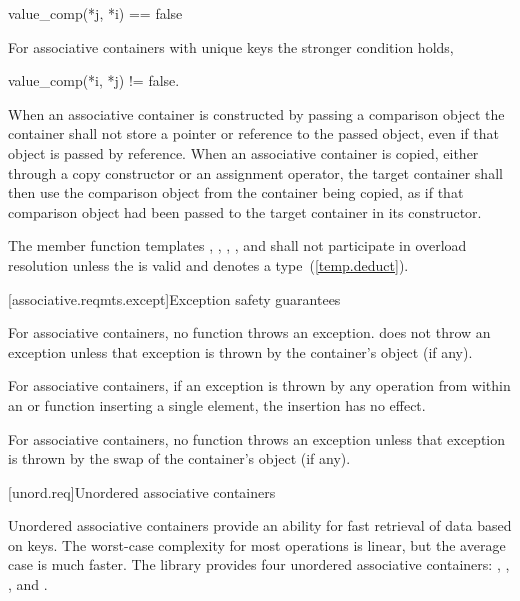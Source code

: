 \begin{codeblock}
value_comp(*j, *i) == false
\end{codeblock}

\pnum
For associative containers with unique keys the stronger condition holds,

\begin{codeblock}
value_comp(*i, *j) != false.
\end{codeblock}

\pnum
When an associative container is constructed by passing a comparison object the
container shall not store a pointer or reference to the passed object,
even if that object is passed by reference.
When an associative container is copied, either through a copy constructor
or an assignment operator,
the target container shall then use the comparison object from the container
being copied,
as if that comparison object had been passed to the target container in
its constructor.

\pnum
The member function templates , , ,
, and  shall not participate in overload
resolution unless the   is valid
and denotes a type~(\ref{temp.deduct}).

%
%
[associative.reqmts.except]{Exception safety guarantees}

\pnum
For associative containers, no  function throws an exception.
 does not throw an exception unless that exception is thrown
by the container's  object (if any).

\pnum
For associative containers, if an exception is thrown by any operation from
within an  or  function inserting a single element, the
insertion has no effect.

\pnum
For associative containers, no  function throws an exception unless
that exception is thrown by the
swap of the container's  object (if any).

[unord.req]{Unordered associative containers}

\pnum
{}%
Unordered associative containers provide an ability for fast retrieval
of data based on keys.  The worst-case complexity for most operations
is linear, but the average case is much faster.  The library provides
four unordered associative containers: ,
, , and
.

